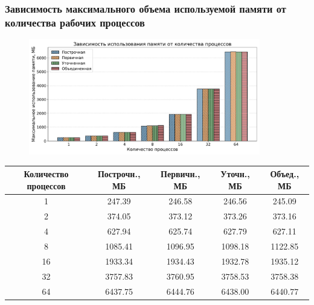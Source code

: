 \documentclass[gray]{beamer}
\begin{document}
\begin{frame}
    \frametitle{Зависимость максимального объема используемой памяти от количества рабочих процессов}
    \begin{figure}[H]
        \centering
        \includegraphics[width=0.9\textwidth]{diag/pama_bar.pdf}
    \end{figure}

    \vspace{-0.5cm}
    \tiny
    \begin{center}
        \begin{tabular}{|c|c|c|c|c|}
            \hline
            \textbf{Количество процессов} & \textbf{Построчн.}, МБ & \textbf{Первичн.}, МБ & \textbf{Уточн.}, МБ & \textbf{Объед., МБ} \\ \hline
            1 & 247.39 & 246.58 & 246.56 & 245.09 \\ \hline
            2 & 374.05 & 373.12 & 373.26 & 373.16 \\ \hline
            4 & 627.94 & 625.74 & 627.79 & 627.11 \\ \hline
            8 & 1085.41 & 1096.95 & 1098.18 & 1122.85 \\ \hline
            16 & 1933.34 & 1934.43 & 1932.78 & 1935.12 \\ \hline
            32 & 3757.83 & 3760.95 & 3758.53 & 3758.38 \\ \hline
            64 & 6437.75 & 6444.76 & 6438.00 & 6440.77 \\ \hline
        \end{tabular}
    \end{center}
\end{frame}
\end{document}
